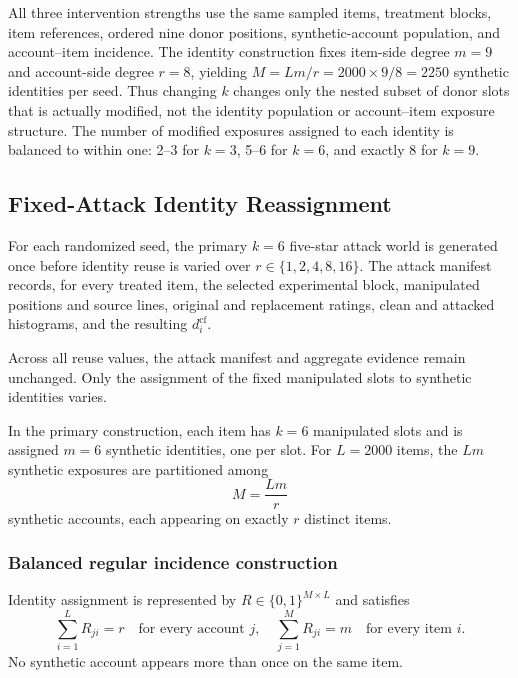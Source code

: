 All three intervention strengths use the same sampled items, treatment
blocks, item references, ordered nine donor positions, synthetic-account
population, and account--item incidence. The identity construction fixes
item-side degree $m=9$ and account-side degree $r=8$, yielding
$M=Lm/r=2000\times 9/8=2250$ synthetic identities per seed. Thus changing
$k$ changes only the nested subset of donor slots that is actually modified,
not the identity population or account--item exposure structure. The number
of modified exposures assigned to each identity is balanced to within one:
2--3 for $k=3$, 5--6 for $k=6$, and exactly 8 for $k=9$.


\subsection{Fixed-Attack Identity Reassignment}
\label{sec:supp-fixed-attack}

For each randomized seed, the primary $k=6$ five-star attack world is
generated once before identity reuse is varied over
$r\in\{1,2,4,8,16\}$. The attack manifest records, for every treated item,
the selected experimental block, manipulated positions and source lines,
original and replacement ratings, clean and attacked histograms, and the
resulting $d_i^{\mathrm{cf}}$.

Across all reuse values, the attack manifest and aggregate evidence remain
unchanged. Only the assignment of the fixed manipulated slots to synthetic
identities varies.

In the primary construction, each item has $k=6$ manipulated slots and is
assigned $m=6$ synthetic identities, one per slot. For $L=2000$ items, the
$Lm$ synthetic exposures are partitioned among
\begin{equation}
\label{eq:supp-fixed-attack-account-count}
M=\frac{Lm}{r}
\end{equation}
synthetic accounts, each appearing on exactly $r$ distinct items.


\subsubsection{Balanced regular incidence construction}
\label{sec:supp-fixed-attack-incidence}

Identity assignment is represented by
$R\in\{0,1\}^{M\times L}$ and satisfies
\[
\sum_{i=1}^{L}R_{ji}=r
\quad\text{for every account }j,
\quad
\sum_{j=1}^{M}R_{ji}=m
\quad\text{for every item }i.
\]
No synthetic account appears more than once on the same item.

